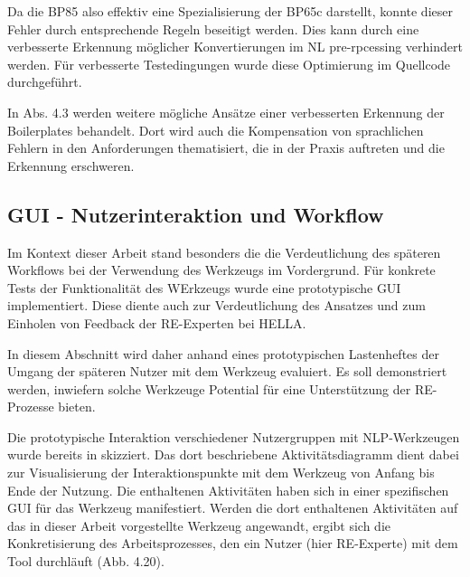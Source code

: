 \documentclass[12pt]{report}
\begin{document}
Da die BP85 also effektiv eine Spezialisierung der BP65c darstellt, konnte dieser Fehler durch entsprechende Regeln beseitigt werden. Dies kann durch eine verbesserte Erkennung möglicher Konvertierungen im NL pre-rpcessing verhindert werden. Für verbesserte Testedingungen wurde diese Optimierung im Quellcode durchgeführt.

In Abs. 4.3 werden weitere mögliche Ansätze einer verbesserten Erkennung der Boilerplates behandelt. Dort wird auch die Kompensation von sprachlichen Fehlern in den Anforderungen thematisiert, die in der Praxis auftreten und die Erkennung erschweren.

\subsection{GUI - Nutzerinteraktion und Workflow}
Im Kontext dieser Arbeit stand besonders die die Verdeutlichung des späteren Workflows bei der Verwendung des Werkzeugs im Vordergrund. Für konkrete Tests der Funktionalität des WErkzeugs wurde eine prototypische GUI implementiert. Diese diente auch zur Verdeutlichung des Ansatzes und zum Einholen von Feedback der RE-Experten bei HELLA.

In diesem Abschnitt wird daher anhand eines prototypischen Lastenheftes der Umgang der späteren Nutzer mit dem Werkzeug evaluiert. Es soll demonstriert werden, inwiefern solche Werkzeuge Potential für eine Unterstützung der RE-Prozesse bieten.

Die prototypische Interaktion verschiedener Nutzergruppen mit NLP-Werkzeugen wurde bereits in \cite{rs18} skizziert. Das dort beschriebene Aktivitätsdiagramm dient dabei zur Visualisierung der Interaktionspunkte mit dem Werkzeug von Anfang bis Ende der Nutzung. Die enthaltenen Aktivitäten haben sich in einer spezifischen GUI für das Werkzeug manifestiert. Werden die dort enthaltenen Aktivitäten auf das in dieser Arbeit vorgestellte Werkzeug angewandt, ergibt sich die Konkretisierung des Arbeitsprozesses, den ein Nutzer (hier RE-Experte) mit dem Tool durchläuft (Abb. 4.20).
\end{document}
